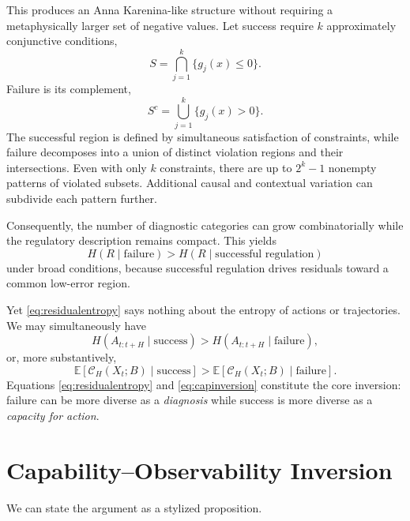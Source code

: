 \documentclass[11pt]{article}
\newcommand{\E}{\mathbb{E}}
\newcommand{\C}{\mathcal{C}}
\begin{document}
This produces an Anna Karenina-like structure without requiring a metaphysically larger set of negative values. Let success require $k$ approximately conjunctive conditions,
\begin{equation}
    S
    =
    \bigcap_{j=1}^{k}
    \{g_j(x)\leq 0\}.
\end{equation}
Failure is its complement,
\begin{equation}
    S^c
    =
    \bigcup_{j=1}^{k}
    \{g_j(x)>0\}.
    \label{eq:unionfail}
\end{equation}
The successful region is defined by simultaneous satisfaction of constraints, while failure decomposes into a union of distinct violation regions and their intersections. Even with only $k$ constraints, there are up to $2^k-1$ nonempty patterns of violated subsets. Additional causal and contextual variation can subdivide each pattern further.

Consequently, the number of diagnostic categories can grow combinatorially while the regulatory description remains compact. This yields
\begin{equation}
    H(R\mid \text{failure})
    >
    H(R\mid \text{successful regulation})
    \label{eq:residualentropy}
\end{equation}
under broad conditions, because successful regulation drives residuals toward a common low-error region.

Yet \eqref{eq:residualentropy} says nothing about the entropy of actions or trajectories. We may simultaneously have
\begin{equation}
    H(A_{t:t+H}\mid \text{success})
    >
    H(A_{t:t+H}\mid \text{failure}),
    \label{eq:actionentropy}
\end{equation}
or, more substantively,
\begin{equation}
    \E[\C_H(X_t;B)\mid\text{success}]
    >
    \E[\C_H(X_t;B)\mid\text{failure}].
    \label{eq:capinversion}
\end{equation}
Equations \eqref{eq:residualentropy} and \eqref{eq:capinversion} constitute the core inversion: failure can be more diverse as a \emph{diagnosis} while success is more diverse as a \emph{capacity for action}.

\section{Capability--Observability Inversion}

We can state the argument as a stylized proposition.
\end{document}
